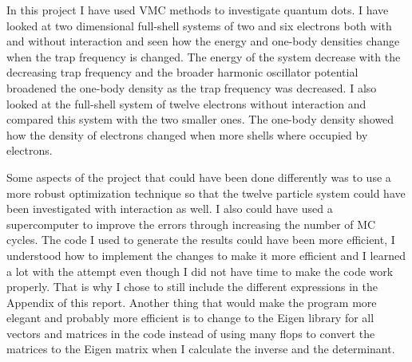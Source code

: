 In this project I have used VMC methods to investigate quantum dots. I have looked at two dimensional full-shell systems of two and six electrons both with and without interaction and seen how the energy and one-body densities change when the trap frequency is changed. The energy of the system decrease with the decreasing trap frequency and the broader harmonic oscillator potential broadened the one-body density as the trap frequency was decreased. I also looked at the full-shell system of twelve electrons without interaction and compared this system with the two smaller ones. The one-body density showed  how the density of electrons changed when more shells where occupied by electrons.

Some aspects of the project that could have been done differently was to use a more robust optimization technique so that the twelve particle system could have been investigated with interaction as well. I also could have used a supercomputer to improve the errors through increasing the number of MC cycles. The code I used to generate the results could have been more efficient, I understood how to implement the changes to make it more efficient and I learned a lot with the attempt even though I did not have time to make the code work properly. That is why I chose to still include the different expressions in the Appendix of this report. Another thing that would make the program more elegant and probably more efficient is to change to the Eigen library for all vectors and matrices in the code instead of using many flops to convert the matrices to the Eigen matrix when I calculate the inverse and the determinant. 



